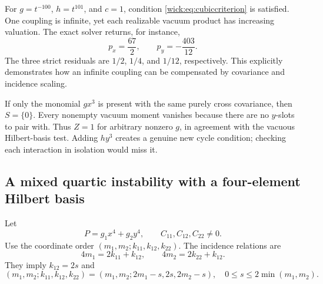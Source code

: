 \documentclass[11pt,letterpaper]{article}
\numberwithin{equation}{section}
\theoremstyle{definition}
\theoremstyle{remark}
\begin{document}
For $g=t^{-100}$, $h=t^{101}$, and $c=1$, condition
\eqref{wick:eq:cubiccriterion} is satisfied. One coupling is infinite, yet each
realizable vacuum product has increasing valuation. The exact solver
returns, for instance,
\[
 p_x=\frac{67}{2},\qquad p_y=-\frac{403}{12}.
\]
The three strict residuals are $1/2$, $1/4$, and $1/12$, respectively.
This explicitly demonstrates how an infinite coupling can be compensated
by covariance and incidence scaling.

If only the monomial $gx^3$ is present with the same purely cross covariance,
then $S=\{0\}$. Every nonempty vacuum moment vanishes because there are no
$y$-slots to pair with. Thus $Z=1$ for arbitrary nonzero $g$, in agreement
with the vacuous Hilbert-basis test. Adding $hy^3$ creates a genuine new
cycle condition; checking each interaction in isolation would miss it.

\subsection{A mixed quartic instability with a four-element Hilbert basis}
\label{wick:sec:mixed}

Let
\[
 P=g_1x^4+g_2y^4,
 \qquad C_{11},C_{12},C_{22}\ne0.
\]
Use the coordinate order $(m_1,m_2;k_{11},k_{12},k_{22})$. The incidence
relations are
\[
 4m_1=2k_{11}+k_{12},\qquad
 4m_2=2k_{22}+k_{12}.
\]
They imply $k_{12}=2s$ and
\[
 (m_1,m_2;k_{11},k_{12},k_{22})
 =(m_1,m_2;2m_1-s,2s,2m_2-s),
 \quad0\le s\le2\min(m_1,m_2).
\]
\end{document}
